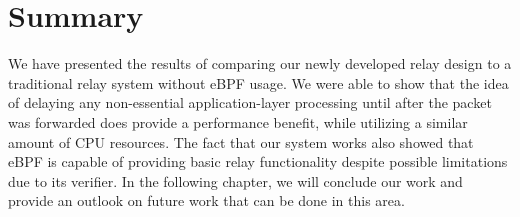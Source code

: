 \section{Summary}\label{sec:summary_ch4}

We have presented the results of comparing our newly developed 
relay design to a traditional relay system without eBPF usage.
We were able to show that the idea of delaying any non-essential
application-layer processing until after the packet was forwarded
does provide a performance benefit, while utilizing a similar 
amount of CPU resources.
The fact that our system works also showed that eBPF is capable of 
providing basic relay functionality despite possible limitations
due to its verifier.
In the following chapter, we will conclude our work and provide
an outlook on future work that can be done in this area.